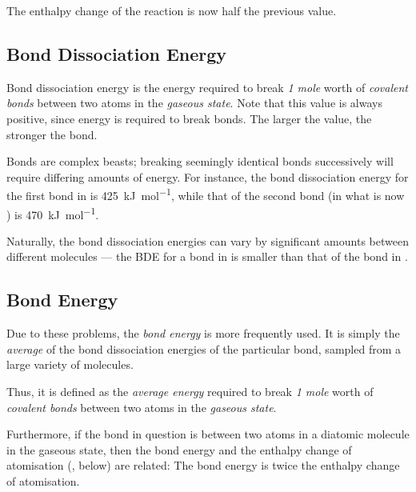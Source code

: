 
		The enthalpy change of the reaction is now half the previous value.


	\pagebreak
	\subsection{Bond Dissociation Energy}

		Bond dissociation energy is the energy required to break \textit{1 mole} worth of \textit{covalent bonds} between two atoms in the
		\textit{gaseous state}. Note that this value is always positive, since energy is required to break bonds. The larger the value,
		the stronger the bond.

		Bonds are complex beasts; breaking seemingly identical bonds successively will require differing amounts of energy. For instance, the
		bond dissociation energy for the first  bond in  is \SI{425}{\kilo\joule\per\mole}, while that of the second 
		bond (in what is now ) is \SI{470}{\kilo\joule\per\mole}.

		Naturally, the bond dissociation energies can vary by significant amounts between different molecules –– the BDE for a  bond
		in  is smaller than that of the  bond in .


	\subsection{Bond Energy}

		Due to these problems, the \textit{bond energy} is more frequently used. It is simply the \textit{average} of the bond dissociation
		energies of the particular bond, sampled from a large variety of molecules.

		Thus, it is defined as the \textit{average energy} required to break \textit{1 mole} worth of \textit{covalent bonds} between two
		atoms in the \textit{gaseous state}.

		Furthermore, if the bond in question is between two atoms in a diatomic molecule in the gaseous state, then the bond energy and
		the enthalpy change of atomisation (, below) are related: The bond energy is twice the enthalpy change of atomisation.

